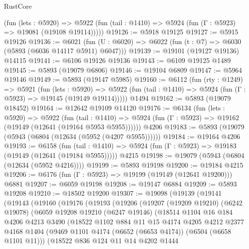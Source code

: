 \begin{lexlean}{RustCore}
\begin{coremodule}
      (fun (lets : @5920) =>
      @5922 (fun (tail : @1410) => @5924 (fun (Γ : @5923) => @19081 (@19108 @19114)))))
@19126 := @5918 @19125
@19127 := @5915 @19126
@19136 := @6021
    (fun (U : @6020) => @6022 (fun (t : @7) => @6030 (@5893 (@6036 @14117 @5911) @6047)))
@19139 := @19101 (@19127 @19136) @14115
@19141 := @6106 @19126 @19136
@19143 := @6109 @19125 @1489
@19145 := @5893 (@19079 @6806)
@19146 := @19104 @6809
@19147 := @5964 @19146
@19149 := @5893 (@19147 @5985)
@19160 := @6112
    (fun (rty : @1249) =>
    @5921
      (fun (lets : @5920) =>
      @5922 (fun (tail : @1410) => @5924 (fun (Γ : @5923) => @19145 (@19149 @19114)))))
    @1494
@19162 := @5893 (@19079 @18452)
@19164 := @12642 @19109 @14120
@19176 := @6134
    (fun (lets : @5920) =>
    @5922
      (fun (tail : @1410) =>
      @5924 (fun (Γ : @5923) => @19162 (@19149 (@12641 (@19164 @5953 @5955))))))
    @4206
@19183 := @5893 (@19079 (@5943 (@6804 (@12634 (@5952 (@4207 @5955))))))
@19184 := @19164 @4206
@19193 := @6158
    (fun (tail : @1410) => @5924 (fun (Γ : @5923) => @19183 (@19149 (@12641 (@19184 @5955)))))
    @4215
@19198 := @19079 (@5943 (@6804 (@12634 (@5952 @4216))))
@19199 := @5893 @19198
@19200 := @19184 @4215
@19206 := @6176 (fun (Γ : @5923) => @19199 (@19149 (@12641 @19200))) @6881
@19207 := @6059 @19198
@19208 := @19147 @6884
@19209 := @5893 @19208
@19210 := @18502 @19200
@19307 := @19098
    (@19139
      (@19141
        (@19143
          (@19160
            (@19176
              (@19193
                (@19206
                  (@19207
                    (@19209 @19210)
                    (@6242 @19078)
                    (@6059
                      @19208
                      @19210
                      (@6247 @19146)
                      (@18514
                        @1104
                        @16
                        @184
                        @4206
                        @4213
                        @3490
                        (@18522
                          @1102
                          @884
                          @11
                          @15
                          @4174
                          @4205
                          @4212
                          @2377
                          @4168
                          @1404
                          (@9469 @1101 @4174 (@6652 (@6653 @4174)) (@6504 (@6658 @1101 @11)))
                          (@18522
                            @836
                            @124
                            @11
                            @14
                            @4202
                            @1444

\end{coremodule}
\end{lexlean}
